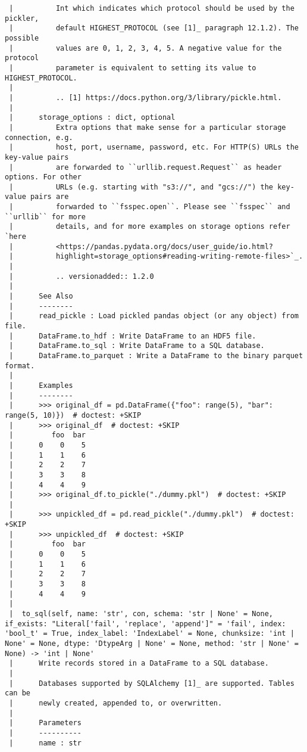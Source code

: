 \documentclass[
  letterpaper,
  DIV=11,
  numbers=noendperiod]{scrreprt}
\begin{document}
\begin{verbatim}
 |          Int which indicates which protocol should be used by the pickler,
 |          default HIGHEST_PROTOCOL (see [1]_ paragraph 12.1.2). The possible
 |          values are 0, 1, 2, 3, 4, 5. A negative value for the protocol
 |          parameter is equivalent to setting its value to HIGHEST_PROTOCOL.
 |      
 |          .. [1] https://docs.python.org/3/library/pickle.html.
 |      
 |      storage_options : dict, optional
 |          Extra options that make sense for a particular storage connection, e.g.
 |          host, port, username, password, etc. For HTTP(S) URLs the key-value pairs
 |          are forwarded to ``urllib.request.Request`` as header options. For other
 |          URLs (e.g. starting with "s3://", and "gcs://") the key-value pairs are
 |          forwarded to ``fsspec.open``. Please see ``fsspec`` and ``urllib`` for more
 |          details, and for more examples on storage options refer `here
 |          <https://pandas.pydata.org/docs/user_guide/io.html?
 |          highlight=storage_options#reading-writing-remote-files>`_.
 |      
 |          .. versionadded:: 1.2.0
 |      
 |      See Also
 |      --------
 |      read_pickle : Load pickled pandas object (or any object) from file.
 |      DataFrame.to_hdf : Write DataFrame to an HDF5 file.
 |      DataFrame.to_sql : Write DataFrame to a SQL database.
 |      DataFrame.to_parquet : Write a DataFrame to the binary parquet format.
 |      
 |      Examples
 |      --------
 |      >>> original_df = pd.DataFrame({"foo": range(5), "bar": range(5, 10)})  # doctest: +SKIP
 |      >>> original_df  # doctest: +SKIP
 |         foo  bar
 |      0    0    5
 |      1    1    6
 |      2    2    7
 |      3    3    8
 |      4    4    9
 |      >>> original_df.to_pickle("./dummy.pkl")  # doctest: +SKIP
 |      
 |      >>> unpickled_df = pd.read_pickle("./dummy.pkl")  # doctest: +SKIP
 |      >>> unpickled_df  # doctest: +SKIP
 |         foo  bar
 |      0    0    5
 |      1    1    6
 |      2    2    7
 |      3    3    8
 |      4    4    9
 |  
 |  to_sql(self, name: 'str', con, schema: 'str | None' = None, if_exists: "Literal['fail', 'replace', 'append']" = 'fail', index: 'bool_t' = True, index_label: 'IndexLabel' = None, chunksize: 'int | None' = None, dtype: 'DtypeArg | None' = None, method: 'str | None' = None) -> 'int | None'
 |      Write records stored in a DataFrame to a SQL database.
 |      
 |      Databases supported by SQLAlchemy [1]_ are supported. Tables can be
 |      newly created, appended to, or overwritten.
 |      
 |      Parameters
 |      ----------
 |      name : str

\end{verbatim}
\end{document}
